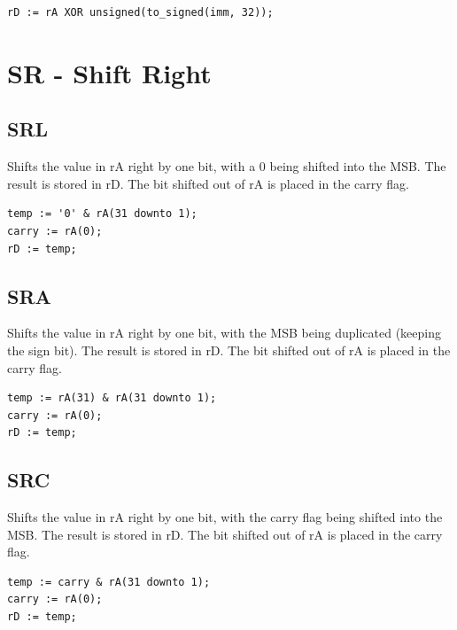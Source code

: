 \documentclass{UoYCSproject}
\begin{document}
\begin{lstlisting}
rD := rA XOR unsigned(to_signed(imm, 32));
\end{lstlisting}

\section{SR - Shift Right}

\subsection{SRL}

Shifts the value in rA right by one bit, with a 0 being shifted into the MSB. The result is stored in rD.
The bit shifted out of rA is placed in the carry flag.

\begin{lstlisting}
temp := '0' & rA(31 downto 1);
carry := rA(0);
rD := temp;
\end{lstlisting}

\subsection{SRA}

Shifts the value in rA right by one bit, with the MSB being duplicated (keeping the sign bit). The result is stored in rD.
The bit shifted out of rA is placed in the carry flag.

\begin{lstlisting}
temp := rA(31) & rA(31 downto 1);
carry := rA(0);
rD := temp;
\end{lstlisting}

\subsection{SRC}

Shifts the value in rA right by one bit, with the carry flag being shifted into the MSB. The result is stored in rD.
The bit shifted out of rA is placed in the carry flag.

\begin{lstlisting}
temp := carry & rA(31 downto 1);
carry := rA(0);
rD := temp;
\end{lstlisting}

\printbibliography
\end{document}
